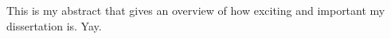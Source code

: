 This is my abstract that gives an overview of how exciting and important my dissertation is. Yay.
\lipsum
